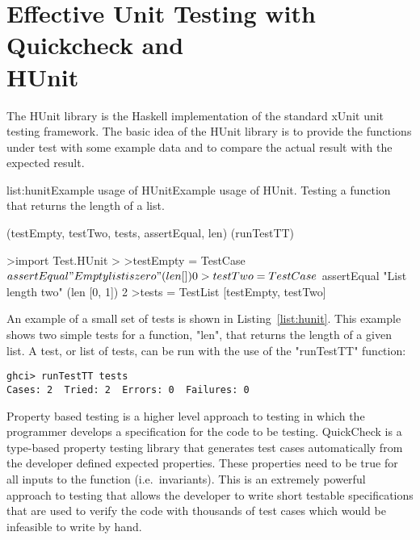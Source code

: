 \section[Effective Unit Testing with Quickcheck and HUnit]{Effective Unit Testing with Quickcheck and \\HUnit}
\label{sec:testing}



The HUnit library is the Haskell implementation of the standard xUnit unit testing framework. The
basic idea of the HUnit library is to provide the functions under test with some example data
and to compare the actual result with the expected result.

\vspace{-0.5em}
\begin{listing}{list:hunit}{Example usage of HUnit}{Example usage of HUnit. Testing a function that returns the length of a list.}{}
\end{listing}\vspace{-1.5em}

\functions(testEmpty, testTwo, tests, assertEqual, len)
\functions(runTestTT)
\begin{haskell}
>import Test.HUnit
>
>testEmpty = TestCase $ assertEqual "Empty list is zero" (len []) 0
>testTwo = TestCase $ assertEqual "List length two" (len [0, 1]) 2
>tests = TestList [testEmpty, testTwo]

\end{haskell}
\noindent An example of a small set of tests is shown in Listing~\ref{list:hunit}. This example shows
two simple tests for a function, "len", that returns the length of a given list.
A test, or list of tests, can be run with the use of the "runTestTT" function:

\begin{verbatim}
ghci> runTestTT tests
Cases: 2  Tried: 2  Errors: 0  Failures: 0
\end{verbatim}


\noindent Property based testing is a higher level approach to testing in which the programmer develops a specification
for the code to be testing. QuickCheck is a type-based property testing library that generates test
cases automatically from the developer defined expected properties.\cite{claessen2000} These properties
need to be true for all inputs to the function (i.e.\ invariants). This is an extremely
powerful approach to testing that allows the developer to write short testable specifications that
are used to verify the code with thousands of test cases which would be infeasible to write by hand.

